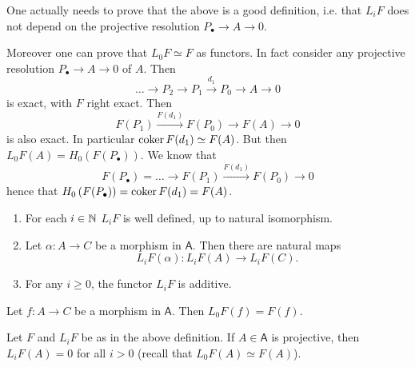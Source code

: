 \begin{rem}[]
	One actually needs to prove that the above is a good definition, i.e.
	that $L_i F$ does not depend on the projective resolution $P_{\bullet} \to A \to 0$.

	Moreover one can prove that $L_0F \simeq F$ as functors.
	In fact consider any projective resolution $P_{\bullet} \to A \to 0$ of $A$. Then
	\begin{equation}
	\ldots \to P_2 \to P_1 \xrightarrow{d_1} P_0 \to A \to 0
	\end{equation} 
	is exact, with $F$ right exact.
	Then 
	\begin{equation}
		F(P_1) \xrightarrow{F(d_1)} F(P_0) \to F(A) \to 0
	\end{equation} 
	is also exact.
	In particular $\operatorname{coker} F(d_1) \simeq F(A)$.
	But then $L_0 F(A) = H_0 \left( F(P_{\bullet}) \right)$.
	We know that
	\begin{equation}
		F(P_{\bullet}) = \ldots \to F(P_1) \xrightarrow{F(d_1)} F(P_0) \to 0
	\end{equation} 
	hence that $H_0 \left( F(P_{\bullet}) \right) = \operatorname{coker} F(d_1) = F(A)$.
\end{rem}

\begin{lem}\leavevmode\vspace{-.2\baselineskip}
	\begin{enumerate}[label=(\alph*)]
		\item For each $i \in \mathbb{N}$ $L_i F$ is well defined, up to natural isomorphism.
		\item Let $\alpha: A \to C$ be a morphism in $\mathsf{A}$.
			Then there are natural maps
			\begin{equation}
				L_i F(\alpha): L_iF(A) \to L_iF(C)
			.\end{equation} 
		\item For any $i \geq 0$, the functor $L_i F$ is additive.
	\end{enumerate}
\end{lem} 

\begin{lem}
	Let $f: A \to C$ be a morphism in $\mathsf{A}$.
	Then $L_0F(f) = F(f)$.
\end{lem} 

\begin{prop}
	Let $F$ and $L_i F$ be as in the above definition.
	If $A \in \mathsf{A}$ is projective, then $L_iF(A) = 0$
	for all $i > 0$ (recall that $L_0F(A) \simeq F(A)$).
\end{prop} 

